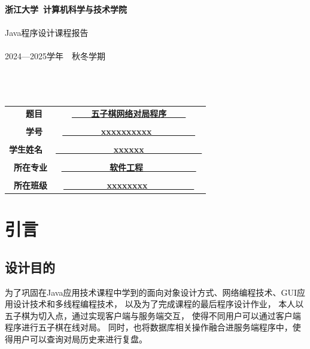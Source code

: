 \documentclass[utf8]{article}
\begin{document}
    \begin{center}
        \huge\textbf{浙江大学\ 计算机科学与技术学院}\\
        \LARGE\textbf{}\\
        \LARGE\textmd{Java程序设计课程报告}\\
        \large\textbf{}\\
        \large\textmd{2024—2025学年\ \  秋冬学期}
        \LARGE\textbf{}\\
        \LARGE\textbf{}\\
        \LARGE\textbf{}\\
        \LARGE\textbf{}\\
    \end{center}
\begin{table}[h]
    \centering
    \large
    \begin{tabular}{rc}
    \Large\textbf{题目\ } & \underline{\Large\textbf{\ \ \ \ 五子棋网络对局程序\ \ \ \ }} \\
    \tiny\textmd{}\\
    \Large\textbf{学号\ } & \underline{\Large\textbf{\ \ \ \ \ \ \ \ xxxxxxxxxx\ \ \ \ \ \ \ \ \ }} \\
    \tiny\textmd{}\\
    \Large\textbf{学生姓名\ } & \underline{\Large\textbf{\ \ \ \ \ \ \ \ \ \ \ \ xxxxxx\ \ \ \ \ \ \ \ \ \ \ \ }} \\
    \tiny\textmd{}\\
    \Large\textbf{所在专业} & \underline{\Large\textbf{\ \ \ \ \ \ \ \ \ \ 软件工程\ \ \ \ \ \ \ \ \ \ \ }} \\
    \tiny\textmd{}\\
    \Large\textbf{所在班级} & \underline{\Large\textbf{\ \ \ \ \ \ \ \ \ xxxxxxxx \ \ \ \ \ \ \ \ \ }} \\
    \end{tabular}
\end{table}
\thispagestyle{empty}

\newpage
\begin{center}
    \tableofcontents
\end{center}
\thispagestyle{empty}
\newpage
\setcounter{page}{1}
\section{引言}
\subsection{设计目的}
为了巩固在Java应用技术课程中学到的面向对象设计方式、网络编程技术、GUI应用设计技术和多线程编程技术，
以及为了完成课程的最后程序设计作业，
本人以五子棋为切入点，通过实现客户端与服务端交互，
使得不同用户可以通过客户端程序进行五子棋在线对局。
同时，也将数据库相关操作融合进服务端程序中，使得用户可以查询对局历史来进行复盘。
\end{document}
